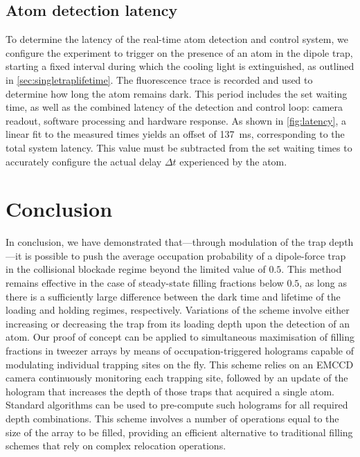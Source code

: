 \documentclass[../Thesis-IJspeert.tex]{subfiles}
\begin{document}
\subsection{Atom detection latency}
To determine the latency of the real-time atom detection and control system, we configure the experiment to trigger on the presence of an atom in the dipole trap, starting a fixed interval during which the cooling light is extinguished, as outlined in \autoref{sec:singletraplifetime}. The fluorescence trace is recorded and used to determine how long the atom remains dark. This period includes the set waiting time, as well as the combined latency of the detection and control loop: camera readout, software processing and hardware response. As shown in \autoref{fig:latency}, a linear fit to the measured times yields an offset of \SI{137}{\milli\second}, corresponding to the total system latency. This value must be subtracted from the set waiting times to accurately configure the actual delay $\Delta t$ experienced by the atom.

\section{Conclusion}
In conclusion, we have demonstrated that---through modulation of the trap depth---it is possible to push the average occupation probability of a dipole-force trap in the collisional blockade regime beyond the limited value of $0.5$. This method remains effective in the case of steady-state filling fractions below $0.5$, as long as there is a sufficiently large difference between the dark time and lifetime of the loading and holding regimes, respectively. Variations of the scheme involve either increasing or decreasing the trap from its loading depth upon the detection of an atom. Our proof of concept can be applied to simultaneous maximisation of filling fractions in tweezer arrays by means of occupation-triggered holograms capable of modulating individual trapping sites on the fly. This scheme relies on an EMCCD camera continuously monitoring each trapping site, followed by an update of the hologram that increases the depth of those traps that acquired a single atom. Standard algorithms can be used to pre-compute such holograms for all required depth combinations. This scheme involves a number of operations equal to the size of the array to be filled, providing an efficient alternative to traditional filling schemes that rely on complex relocation operations.
\end{document}
